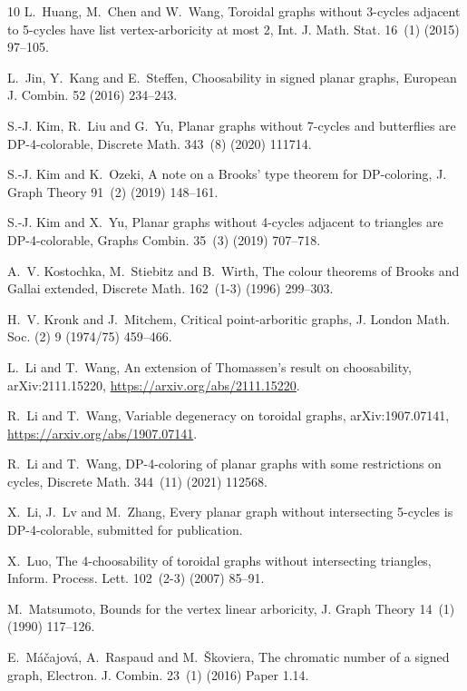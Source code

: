 \documentclass{article}
\theoremstyle{definition}
\begin{document}
\begin{thebibliography}{10}
L.~Huang, M.~Chen and W.~Wang, Toroidal graphs without 3-cycles adjacent to
  5-cycles have list vertex-arboricity at most 2, Int. J. Math. Stat. 16~(1)
  (2015) 97--105.

L.~Jin, Y.~Kang and E.~Steffen, Choosability in signed planar graphs, European
  J. Combin. 52 (2016) 234--243.

S.-J. Kim, R.~Liu and G.~Yu, Planar graphs without 7-cycles and butterflies are
  {DP}-4-colorable, Discrete Math. 343~(8) (2020) 111714.

S.-J. Kim and K.~Ozeki, A note on a {B}rooks' type theorem for {DP}-coloring,
  J. Graph Theory 91~(2) (2019) 148--161.

S.-J. Kim and X.~Yu, Planar graphs without 4-cycles adjacent to triangles are
  {DP}-4-colorable, Graphs Combin. 35~(3) (2019) 707--718.

A.~V. Kostochka, M.~Stiebitz and B.~Wirth, The colour theorems of {B}rooks and
  {G}allai extended, Discrete Math. 162~(1-3) (1996) 299--303.

H.~V. Kronk and J.~Mitchem, Critical point-arboritic graphs, J. London Math.
  Soc. (2) 9 (1974/75) 459--466.

L.~Li and T.~Wang, An extension of {Thomassen}’s result on choosability,
  arXiv:2111.15220,   \url{https://arxiv.org/abs/2111.15220}.

R.~Li and T.~Wang, Variable degeneracy on toroidal graphs, arXiv:1907.07141,
  \url{https://arxiv.org/abs/1907.07141}.

R.~Li and T.~Wang, D{P}-4-coloring of planar graphs with some restrictions on
  cycles, Discrete Math. 344~(11) (2021) 112568.

X.~Li, J.~Lv and M.~Zhang, Every planar graph without intersecting 5-cycles is
  {DP}-4-colorable,   submitted for publication.

X.~Luo, The 4-choosability of toroidal graphs without intersecting triangles,
  Inform. Process. Lett. 102~(2-3) (2007) 85--91.

M.~Matsumoto, Bounds for the vertex linear arboricity, J. Graph Theory 14~(1)
  (1990) 117--126.

E.~M\'a\v{c}ajov\'a, A.~Raspaud and M.~\v{S}koviera, The chromatic number of a
  signed graph, Electron. J. Combin. 23~(1) (2016) Paper 1.14.


\end{thebibliography}
\end{document}
